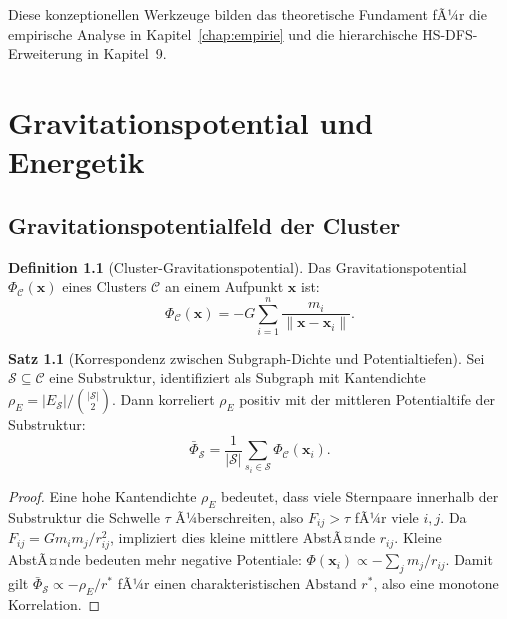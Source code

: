 ﻿\documentclass[a4paper,12pt]{report}
\theoremstyle{definition}
\newtheorem{definition}{Definition}
\newtheorem{satz}{Satz}
\begin{document}
Diese konzeptionellen Werkzeuge bilden das theoretische Fundament fÃ¼r die empirische Analyse in Kapitel~\ref{chap:empirie} und die hierarchische HS-DFS-Erweiterung in Kapitel~9.

\chapter{Gravitationspotential und Energetik}

\section{Gravitationspotentialfeld der Cluster}

\begin{definition}[Cluster-Gravitationspotential]
Das Gravitationspotential $\Phi_\mathcal{C}(\mathbf{x})$ eines Clusters $\mathcal{C}$ an einem Aufpunkt $\mathbf{x}$ ist:
\[
\Phi_\mathcal{C}(\mathbf{x}) = -G \sum_{i=1}^{n} \frac{m_i}{\|\mathbf{x} - \mathbf{x}_i\|}.
\]
\end{definition}

\begin{satz}[Korrespondenz zwischen Subgraph-Dichte und Potentialtiefen]
\label{satz:potdichte}
Sei $\mathcal{S} \subseteq \mathcal{C}$ eine Substruktur, identifiziert als Subgraph mit Kantendichte $\rho_E = |E_\mathcal{S}| / \binom{|\mathcal{S}|}{2}$. Dann korreliert $\rho_E$ positiv mit der mittleren Potentialtife der Substruktur:
\[
\bar{\Phi}_\mathcal{S} = \frac{1}{|\mathcal{S}|} \sum_{s_i \in \mathcal{S}} \Phi_\mathcal{C}(\mathbf{x}_i).
\]
\end{satz}

\begin{proof}
Eine hohe Kantendichte $\rho_E$ bedeutet, dass viele Sternpaare innerhalb der Substruktur die Schwelle $\tau$ Ã¼berschreiten, also $F_{ij} > \tau$ fÃ¼r viele $i,j$. Da $F_{ij} = G m_i m_j / r_{ij}^2$, impliziert dies kleine mittlere AbstÃ¤nde $r_{ij}$. Kleine AbstÃ¤nde bedeuten mehr negative Potentiale: $\Phi(\mathbf{x}_i) \propto -\sum_j m_j / r_{ij}$. Damit gilt $\bar{\Phi}_\mathcal{S} \propto -\rho_E / r^*$ fÃ¼r einen charakteristischen Abstand $r^*$, also eine monotone Korrelation.
\end{proof}
\end{document}
